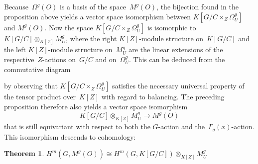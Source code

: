\documentclass[12pt]{article}
\theoremstyle{definition}
\newtheorem{Theorem}[Satz]{Theorem}
\theoremstyle{break}
\renewcommand{\1}{\mathbbm{1}}
\newcommand{\ot}{\mathbin{\otimes}}
\begin{document}
Because~$\Omega^g(O)$ is a basis of the space~$M^g(O)$, the bijection found in the proposition above yields a vector space isomorphism between $K[G/C \times_Z \Omega_U^{g}]$ and $M^g(O)$. Now the space
\mbox{$K[G/C \times_Z \Omega_U^{g}]$} is isomorphic to $K[G/C] \ot_{K[Z]} M_U^{g}$, where the right \mbox{$K[Z]$-module} structure on~$K[G/C]$ and the left $K[Z]$-module structure on~$M_U^{g}$ are the linear extensions of the respective~$Z$-actions on~$G/C$ and on~$\Omega_U^{g}$. This can be deduced from the commutative diagram
\begin{center}
\end{center}
by observing that $K[G/C \times_Z \Omega_U^{g}]$ satisfies the necessary universal property of the tensor product over~$K[Z]$ with regard to balancing. The preceding proposition therefore also yields a vector space isomorphism
\[K[G/C] \ot_{K[Z]} M_U^{g} \to M^g(O)\]
that is still equivariant with respect to both the $G$-action and the~$\Gamma_{g}(x)$-action. This isomorphism descends to cohomology:
\begin{Theorem} \label{ThmDecomp}
$H^m(G,M^g(O)) \cong H^m(G,K[G/C]) \ot_{K[Z]} M_U^{g}$
\end{Theorem}
\end{document}
